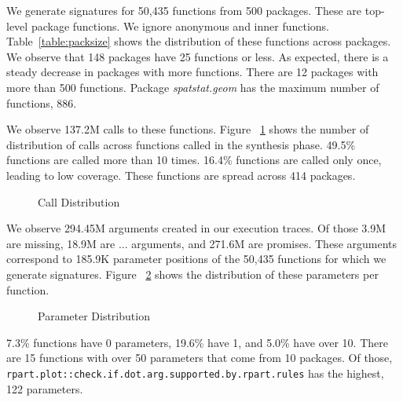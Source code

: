 \documentclass[review,nonacm,screen,acmsmall,anonymous=true]{acmart}
\renewcommand{\c}[1]{\lstinline |#1|\xspace}
\begin{document}
We generate signatures for 50,435 functions from 500 packages. These are
top-level package functions. We ignore anonymous and inner functions.
Table~\ref{table:packsize} shows the distribution of these functions across
packages. We observe that 148 packages have 25 functions or less. As expected,
there is a steady decrease in packages with more functions. There are 12
packages with more than 500 functions. Package \emph{spatstat.geom} has the
maximum number of functions, 886.

We observe 137.2M calls to these functions. Figure ~\ref{fig:callDist} shows the
number of distribution of calls across functions called in the synthesis
phase. 49.5\% functions are called more than 10 times. 16.4\% functions are
called only once, leading to low coverage. These functions are spread across 414
packages.
%
\begin{figure}[!h]
  \centering
  
  \caption{Call Distribution}
  \label{fig:callDist}
\end{figure}
%
We observe 294.45M arguments created in our execution traces. Of those 3.9M are
missing, 18.9M are $...$ arguments, and 271.6M are promises. These arguments
correspond to 185.9K parameter positions of the 50,435 functions for which we
generate signatures. Figure ~\ref{fig:paramDist} shows the distribution of these
parameters per function.
%
\begin{figure}[!h]
  \centering
  
  \caption{Parameter Distribution}
  \label{fig:paramDist}
\end{figure}
%
7.3\% functions have 0 parameters, 19.6\% have 1, and 5.0\% have over 10. There
are 15 functions with over 50 parameters that come from 10 packages. Of those,
\c{rpart.plot::check.if.dot.arg.supported.by.rpart.rules} has the highest, 122
parameters.

\end{document}
